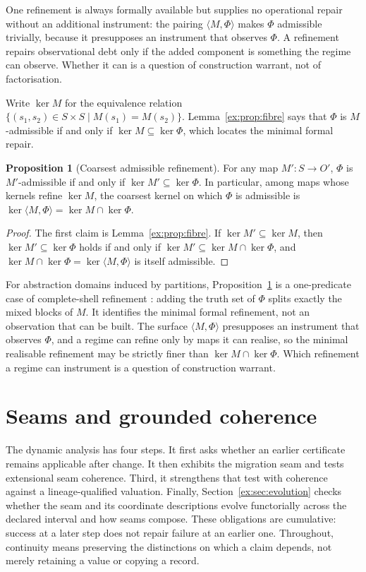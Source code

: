 \documentclass[11pt]{article}
\theoremstyle{definition}
\newtheorem{proposition}{Proposition}[section]
\begin{document}
One refinement is always formally available but supplies no operational repair without an additional instrument: the pairing $\langle M,\Phi \rangle$ makes $\Phi$ admissible trivially, because it presupposes an instrument that observes $\Phi$. A refinement repairs observational debt only if the added component is something the regime can observe. Whether it can is a question of construction warrant, not of factorisation.

Write $\ker M$ for the equivalence relation $\{(s_1,s_2)\in S\times S\mid M(s_1)=M(s_2)\}$. Lemma~\ref{ex:prop:fibre} says that $\Phi$ is $M$-admissible if and only if $\ker M \subseteq \ker \Phi$, which locates the minimal formal repair.

\begin{proposition}[Coarsest admissible refinement]\label{ex:prop:shell}
For any map $M':S\to O'$, $\Phi$ is $M'$-admissible if and only if $\ker M' \subseteq \ker \Phi$. In particular, among maps whose kernels refine $\ker M$, the coarsest kernel on which $\Phi$ is admissible is $\ker \langle M,\Phi \rangle=\ker M \cap \ker \Phi$.
\end{proposition}

\begin{proof}
The first claim is Lemma~\ref{ex:prop:fibre}. If $\ker M' \subseteq \ker M$, then $\ker M' \subseteq \ker \Phi$ holds if and only if $\ker M' \subseteq \ker M \cap \ker \Phi$, and $\ker M \cap \ker \Phi=\ker \langle M,\Phi \rangle$ is itself admissible.
\end{proof}

For abstraction domains induced by partitions, Proposition~\ref{ex:prop:shell} is a one-predicate case of complete-shell refinement \citep{giacobazziranzatoscozzari2000,ranzatotapparo2004}: adding the truth set of $\Phi$ splits exactly the mixed blocks of $M$. It identifies the minimal formal refinement, not an observation that can be built. The surface $\langle M,\Phi \rangle$ presupposes an instrument that observes $\Phi$, and a regime can refine only by maps it can realise, so the minimal realisable refinement may be strictly finer than $\ker M\cap\ker\Phi$. Which refinement a regime can instrument is a question of construction warrant.


\section{Seams and grounded coherence}\label{ex:sec:seams}\label{ch:change}

The dynamic analysis has four steps. It first asks whether an earlier certificate remains applicable after change. It then exhibits the migration seam and tests extensional seam coherence. Third, it strengthens that test with coherence against a lineage-qualified valuation. Finally, Section~\ref{ex:sec:evolution} checks whether the seam and its coordinate descriptions evolve functorially across the declared interval and how seams compose. These obligations are cumulative: success at a later step does not repair failure at an earlier one. Throughout, continuity means preserving the distinctions on which a claim depends, not merely retaining a value or copying a record.
\end{document}
